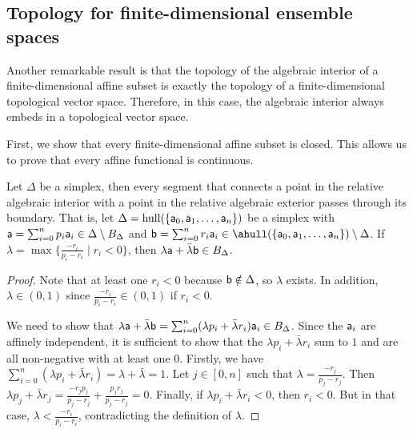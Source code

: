 \subsection{Topology for finite-dimensional ensemble spaces}

Another remarkable result is that the topology of the algebraic interior of a finite-dimensional affine subset is exactly the topology of a finite-dimensional topological vector space. Therefore, in this case, the algebraic interior always embeds in a topological vector space.

First, we show that every finite-dimensional affine subset is closed. This allows us to prove that every affine functional is continuous.

\begin{mathSection}
	\begin{lemma}\label{pm-es-passThroughSimplexBoundary}
		Let $\Delta$ be a simplex, then every segment that connects a point in the relative algebraic interior with a point in the relative algebraic exterior passes through its boundary. 
		That is, let $\Delta = \hull(\{\ens[a]_0,\ens[a]_1,\ldots,\ens[a]_n\})$ be a simplex with  $\ens[a] = \sum_{i=0}^np_i\ens[a]_i \in \Delta \setminus B_\Delta$ and $\ens[b] = \sum_{i=0}^nr_i\ens[a]_i \in \ahull(\{\ens[a]_0,\ens[a]_1,\ldots,\ens[a]_n\}) \setminus \Delta$. If $\lambda = \max\{\frac{-r_i}{p_i-r_i} \mid r_i < 0\}$, then $\lambda\ens[a] + \bar{\lambda}\ens[b] \in B_\Delta$.
	\end{lemma}
	
	\begin{proof}
		Note that at least one $r_i < 0$ because $\ens[b] \notin \Delta$, so $\lambda$ exists. In addition, $\lambda \in (0,1)$ since $\frac{-r_i}{p_i-r_i} \in (0,1)$ if $r_i < 0$.
		
		We need to show that $\lambda\ens[a] + \bar{\lambda}\ens[b] = \sum_{i=0}^n(\lambda p_i + \bar{\lambda}r_i)\ens[a]_i \in B_\Delta$. Since the $\ens[a]_i$ are affinely independent, it is sufficient to show that the $\lambda p_i + \bar{\lambda}r_i$ sum to $1$ and are all non-negative with at least one $0$. Firstly, we have $\sum_{i=0}^n (\lambda p_i + \bar{\lambda}r_i) = \lambda + \bar{\lambda} = 1$. Let $j \in [0,n]$ such that $\lambda = \frac{-r_j}{p_j-r_j}$. Then $\lambda p_j + \bar{\lambda} r_j = \frac{-r_j p_j}{p_j - r_j} + \frac{p_jr_j}{p_j - r_j} = 0$. Finally, if $\lambda p_i + \bar{\lambda}r_i < 0$, then $r_i < 0$. But in that case, $\lambda < \frac{-r_i}{p_i-r_i}$, contradicting the definition of $\lambda$.
	\end{proof}
	

\end{mathSection}
